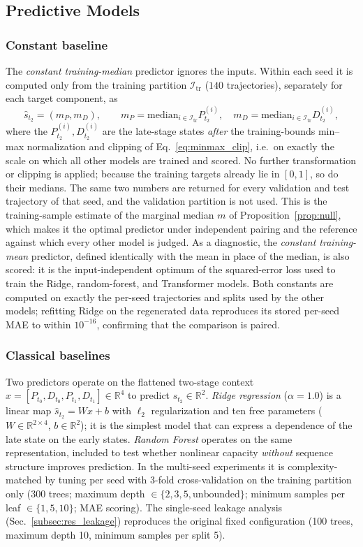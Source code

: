 \documentclass[pdflatex,sn-mathphys-num]{sn-jnl}
\theoremstyle{thmstyleone}%
\theoremstyle{thmstyletwo}%
\theoremstyle{thmstylethree}%
\begin{document}
\subsection{\textbf{Predictive Models}}
\label{subsec:models}

\subsubsection{Constant baseline} The \emph{constant training-median} predictor ignores the inputs. Within each seed it is computed only from the training partition $\mathcal{I}_{\mathrm{tr}}$ ($140$ trajectories), separately for each target component, as
\[
\hat{s}_{t_2}=(m_P,m_D),\qquad m_P=\mathrm{median}_{i\in\mathcal{I}_{\mathrm{tr}}}P^{(i)}_{t_2},\quad m_D=\mathrm{median}_{i\in\mathcal{I}_{\mathrm{tr}}}D^{(i)}_{t_2},
\]
where the $P^{(i)}_{t_2},D^{(i)}_{t_2}$ are the late-stage states \emph{after} the training-bounds min--max normalization and clipping of Eq.~\eqref{eq:minmax_clip}, i.e.\ on exactly the scale on which all other models are trained and scored. No further transformation or clipping is applied; because the training targets already lie in $[0,1]$, so do their medians. The same two numbers are returned for every validation and test trajectory of that seed, and the validation partition is not used. This is the training-sample estimate of the marginal median $m$ of Proposition~\ref{prop:null}, which makes it the optimal predictor under independent pairing and the reference against which every other model is judged. As a diagnostic, the \emph{constant training-mean} predictor, defined identically with the mean in place of the median, is also scored: it is the input-independent optimum of the squared-error loss used to train the Ridge, random-forest, and Transformer models. Both constants are computed on exactly the per-seed trajectories and splits used by the other models; refitting Ridge on the regenerated data reproduces its stored per-seed MAE to within $10^{-16}$, confirming that the comparison is paired.

\subsubsection{Classical baselines} Two predictors operate on the flattened two-stage context $x=[P_{t_0},D_{t_0},P_{t_1},D_{t_1}]\in\mathbb{R}^4$ to predict $\hat{s}_{t_2}\in\mathbb{R}^2$. \emph{Ridge regression} ($\alpha=1.0$) is a linear map $\hat{s}_{t_2}=Wx+b$ with $\ell_2$ regularization and ten free parameters ($W\in\mathbb{R}^{2\times4}$, $b\in\mathbb{R}^2$); it is the simplest model that can express a dependence of the late state on the early states. \emph{Random Forest} operates on the same representation, included to test whether nonlinear capacity \emph{without} sequence structure improves prediction. In the multi-seed experiments it is complexity-matched by tuning per seed with 3-fold cross-validation on the training partition only (300 trees; maximum depth $\in\{2,3,5,\text{unbounded}\}$; minimum samples per leaf $\in\{1,5,10\}$; MAE scoring). The single-seed leakage analysis (Sec.~\ref{subsec:res_leakage}) reproduces the original fixed configuration (100 trees, maximum depth 10, minimum samples per split 5).
\end{document}

